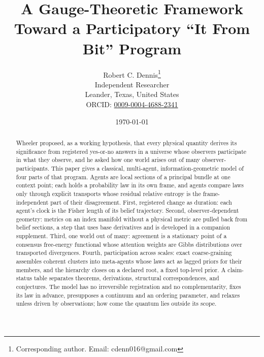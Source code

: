 \documentclass[11pt]{article}
\begin{document}
\title{A Gauge-Theoretic Framework Toward a Participatory ``It From Bit'' Program}

\author{
  Robert C. Dennis\thanks{Corresponding author. Email: cdenn016@gmail.com}\\[0.3cm]
  \small Independent Researcher\\
  \small Leander, Texas, United States\\[0.2cm]
  \small ORCID: \href{https://orcid.org/0009-0004-4688-2341}{0009-0004-4688-2341}
}

\date{\today}

\maketitle

\begin{abstract}
Wheeler proposed, as a working hypothesis, that every physical quantity derives its significance from registered yes-or-no answers in a universe whose observers participate in what they observe, and he asked how one world arises out of many observer-participants. This paper gives a classical, multi-agent, information-geometric model of four parts of that program. Agents are local sections of a principal bundle at one context point; each holds a probability law in its own frame, and agents compare laws only through explicit transports whose residual relative entropy is the frame-independent part of their disagreement. First, registered change as duration: each agent's clock is the Fisher length of its belief trajectory. Second, observer-dependent geometry: metrics on an index manifold without a physical metric are pulled back from belief sections, a step that uses base derivatives and is developed in a companion supplement. Third, one world out of many: agreement is a stationary point of a consensus free-energy functional whose attention weights are Gibbs distributions over transported divergences. Fourth, participation across scales: exact coarse-graining assembles coherent clusters into meta-agents whose laws act as lagged priors for their members, and the hierarchy closes on a declared root, a fixed top-level prior. A claim-status table separates theorems, derivations, structural correspondences, and conjectures. The model has no irreversible registration and no complementarity, fixes its law in advance, presupposes a continuum and an ordering parameter, and relaxes unless driven by observations; how come the quantum lies outside its scope.
\end{abstract}
\end{document}
